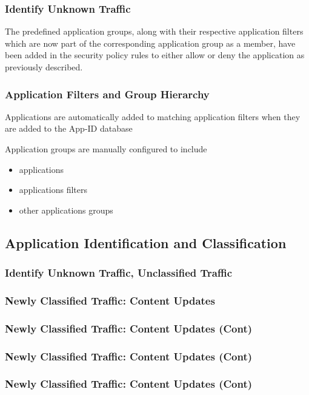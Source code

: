 \subsubsection{Identify Unknown Traffic}
The predefined application groups, along with their respective application filters which are now part of the corresponding application group as a member, 
have been added in the security policy rules to either allow or deny the application as previously described.
\subsubsection{Application Filters and Group Hierarchy}
Applications are automatically added to matching application filters when they are added to the App-ID database

Application groups are manually configured to include
    \begin{itemize}
        \item applications
        \item applications filters
        \item other applications groups
    \end{itemize}
\subsection{Application Identification and Classification}
\subsubsection{Identify Unknown Traffic, Unclassified Traffic}
\subsubsection{Newly Classified Traffic:  Content Updates}
\subsubsection{Newly Classified Traffic:  Content Updates (Cont)}
\subsubsection{Newly Classified Traffic:  Content Updates (Cont)}
\subsubsection{Newly Classified Traffic:  Content Updates (Cont)}

